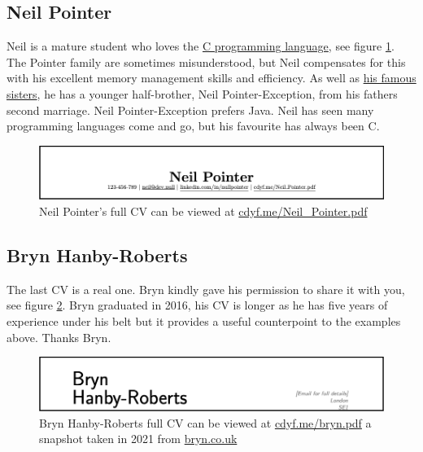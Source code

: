 \documentclass[
]{book}
\begin{document}
\hypertarget{neil-pointer}{%
\subsection{Neil Pointer}\label{neil-pointer}}

Neil is a mature student who loves the \href{https://en.wikipedia.org/wiki/C_(programming_language)}{C programming language}, see figure \ref{fig:neilpointer-fig}. The Pointer family are sometimes misunderstood, but Neil compensates for this with his excellent memory management skills and efficiency. As well as \href{https://en.wikipedia.org/wiki/The_Pointer_Sisters}{his famous sisters}, he has a younger half-brother, Neil Pointer-Exception, from his fathers second marriage. Neil Pointer-Exception prefers Java. Neil has seen many programming languages come and go, but his favourite has always been C.

\begin{figure}

{\centering \includegraphics[width=1\linewidth]{images/neil_pointer} 

}

\caption{Neil Pointer's full CV can be viewed at \href{https://www.cdyf.me/Neil_Pointer.pdf}{cdyf.me/Neil\_Pointer.pdf}}\label{fig:neilpointer-fig}
\end{figure}



\hypertarget{bryn}{%
\subsection{Bryn Hanby-Roberts}\label{bryn}}

The last CV is a real one. Bryn kindly gave his permission to share it with you, see figure \ref{fig:bryn-fig}. Bryn graduated in 2016, his CV is longer as he has five years of experience under his belt but it provides a useful counterpoint to the examples above. Thanks Bryn. 🙏

\begin{figure}

{\centering \includegraphics[width=1\linewidth]{images/bryn} 

}

\caption{Bryn Hanby-Roberts full CV can be viewed at \href{https://www.cdyf.me/bryn.pdf}{cdyf.me/bryn.pdf} a snapshot taken in 2021 from \href{http://bryn.co.uk}{bryn.co.uk}}\label{fig:bryn-fig}
\end{figure}
\end{document}
